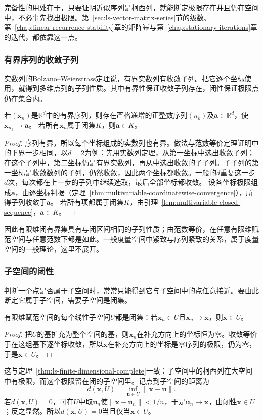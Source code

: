 完备性的用处在于，只要证明近似序列是柯西列，就能断定极限存在并且仍在空间中，不必事先找出极限。第~\ref{sec:ls-vector-matrix-series}节的级数、第~\ref{chap:linear-recurrence-stability}章的矩阵幂与第~\ref{chap:stationary-iterations}章的迭代，都依靠这一点。

\subsubsection{有界序列的收敛子列}
\label{sec:multivariable-bolzano-weierstrass-section}

实数列的Bolzano--Weierstrass定理说，有界实数列有收敛子列。把它逐个坐标使用，就得到多维点列的子列性质。其中有界性保证收敛子列存在，闭性保证极限点仍在集合内。
\begin{theorem}[有限维有界序列的收敛子列]
\label{thm:multivariable-bolzano-weierstrass}
若$(\bm x_n)$是$\mathbb R^d$中的有界序列，则存在严格递增的正整数序列$(n_k)$及$\bm a\in\mathbb R^d$，使$\bm x_{n_k}\to\bm a$。
若所有$\bm x_n$属于闭集$K$，则$\bm a\in K$。
\end{theorem}
\begin{proof}
序列有界，所以每个坐标组成的实数列也有界。做法与范数等价定理证明中的下界一步相同，以$d=2$为例：先用实数列定理，从第一坐标中选出收敛子列；在这个子列中，第二坐标仍是有界实数列，再从中选出收敛的子子列。子子列的第一坐标是收敛数列的子列，仍然收敛，因此两个坐标都收敛。一般的$d$重复这一步$d$次，每次都在上一步的子列中继续选取，最后全部坐标都收敛。
设各坐标极限组成$\bm a$，由逐坐标判据（定理~\ref{thm:multivariable-coordinatewise-convergence}），所得子列收敛于$\bm a$。
若所有项都属于闭集$K$，由引理~\ref{lem:multivariable-closed-sequence}，$\bm a\in K$。
\end{proof}
因此有限维闭有界集具有与闭区间相同的子列性质；由范数等价，在任意有限维赋范空间与任意范数下都是如此。一般度量空间中紧致与序列紧致的关系，属于度量空间的一般理论，这里不展开。

\subsubsection{子空间的闭性}
\label{sec:ls-subspace-closedness}

判断一个点是否属于子空间时，常常只能得到它与子空间中的点任意接近。要由此断定它属于子空间，需要子空间是闭集。
\begin{theorem}[有限维子空间闭性]
\label{thm:ls-subspace-closed}
有限维赋范空间的每个线性子空间$U$都是闭集：若$\bm x_n\in U$且$\bm x_n\to\bm x$，则$\bm x\in U$。
\end{theorem}
\begin{proof}
把$U$的基扩充为整个空间的基，则$\bm x_n$在补充方向上的坐标恒为零。收敛等价于在这组基下逐坐标收敛，所以$\bm x$在补充方向上的坐标是零序列的极限，仍为零，于是$\bm x\in U$。
\end{proof}
这与定理~\ref{thm:ls-finite-dimensional-complete}一致：子空间中的柯西列在大空间中有极限，而这个极限留在闭的子空间里。记点到子空间的距离为
\[
 d(\bm x,U)=\inf_{\bm u\in U}\lVert\bm x-\bm u\rVert.
\]
若$d(\bm x,U)=0$，可在$U$中取$\bm u_n$使$\lVert\bm x-\bm u_n\rVert<1/n$，于是$\bm u_n\to\bm x$，由闭性$\bm x\in U$；反之显然。所以$d(\bm x,U)=0$当且仅当$\bm x\in U$。

